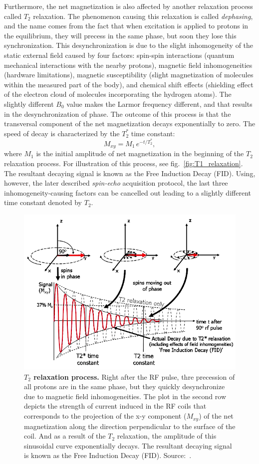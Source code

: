 Furthermore, the net magnetization is also affected by another relaxation process called $T_2$ relaxation. The phenomenon causing this relaxation is called \textit{dephasing}, and the name comes from the fact that when excitation is applied to protons in the equilibrium, they will precess in the same phase, but soon they lose this synchronization. This desynchronization is due to the slight inhomogeneity of the static external field caused by four factors: spin-spin interactions (quantum mechanical interactions with the nearby protons), magnetic field inhomogeneities (hardware limitations), magnetic susceptibility (slight magnetization of molecules within the measured part of the body), and chemical shift effects (shielding effect of the electron cloud of molecules incorporating the hydrogen atoms). The slightly different $B_0$ value makes the Larmor frequency different, and that results in the desynchronization of phase. The outcome of this process is that the transversal component of the net magnetization decays exponentially to zero. The speed of decay is characterized by the $T_2^*$ time constant:
\[M_{xy} = M_1\,e^{-t/T_2^*},\]
where $M_1$ is the initial amplitude of net magnetization in the beginning of the $T_2$ relaxation process. For illustration of this process, see fig.~\ref{fig:T1_relaxation}. The resultant decaying signal is known as the Free Induction Decay (FID). Using, however, the later described \textit{spin-echo} acquisition protocol, the last three inhomogeneity-causing factors can be cancelled out leading to a slightly different time constant denoted by $T_2$.

\begin{figure}[thb]
    \centering
    \includegraphics[width=0.8\linewidth]{images/T2_relaxation.png}
    \caption{\textbf{$T_2$ relaxation process.} Right after the RF pulse, thre precession of all protons are in the same phase, but they quickly desynchronize due to magnetic field inhomogeneities. The plot in the second row depicts the strength of current induced in the RF coils that corresponds to the projection of the x-y component ($M_{xy}$) of the net magnetization along the direction perpendicular to the surface of the coil. And as a result of the $T_2$ relaxation, the amplitude of this sinusoidal curve exponentially decays. The resultant decaying signal is known as the Free Induction Decay (FID). Source:~\cite{ridgway_cardiovascular_2010}.}
    \label{fig:T2_relaxation}
\end{figure}

